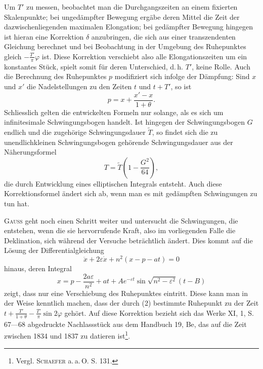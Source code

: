 Um \(T'\) zu messen, beobachtet man die Durchgangszeiten an einem fixierten
Skalenpunkte; bei ungedämpfter Bewegung ergäbe deren Mittel die Zeit der
dazwischenliegenden maximalen Elongation; bei gedämpfter Bewegung hingegen
ist hieran eine Korrektion \(\delta\) anzubringen, die sich aus einer transzendenten
Gleichung berechnet und bei Beobachtung in der Umgebung des Ruhepunktes
gleich \(-\frac{T'}{\pi}\varphi\) ist. Diese Korrektion verschiebt also alle Elongationszeiten
um ein konstantes Stück, spielt somit für deren Unterschied, d.\,h. \(T'\), keine
Rolle. Auch die Berechnung des Ruhepunktes \(p\) modifiziert sich infolge der
Dämpfung: Sind \(x\) und \(x'\) die Nadelstellungen zu den Zeiten \(t\) und \(t+T'\), so ist
\[
p=x+\frac{x'-x}{1+\theta}.\tag{2}
\]
\noindent Schliesslich gelten die entwickelten Formeln nur solange, als es sich um infinitesimale
Schwingungsbogen handelt. Ist hingegen der Schwingungsbogen
\(G\) endlich und die zugehörige Schwingungsdauer \(\widetilde T\), so findet sich die zu unendlichkleinen
Schwingungsbogen gehörende Schwingungsdauer aus der Näherungsformel
\[
T=\widetilde T\left(1-\frac{G^2}{64}\right),
\]
\noindent die durch Entwicklung eines elliptischen Integrals entsteht. Auch diese Korrektionsformel
ändert sich ab, wenn man es mit gedämpften Schwingungen zu
tun hat.

\textsc{Gauss} geht noch einen Schritt weiter und untersucht die Schwingungen,
die entstehen, wenn die sie hervorrufende Kraft, also im vorliegenden Falle
die Deklination, sich während der Versuche beträchtlich ändert. Dies kommt
auf die Lösung der Differentialgleichung
\[
\ddot{x}+2\varepsilon\dot{x}+n^2(x-p-at)=0\tag{3}
\]
\noindent hinaus, deren Integral
\[
x=p-\frac{2a\varepsilon}{n^2}+at+Ae^{-\varepsilon t}\sin\sqrt{n^2-\varepsilon^2}(t-B)
\]
\noindent zeigt, dass nur eine Verschiebung des Ruhepunktes eintritt. Diese kann man
in der Weise kenntlich machen, dass der durch (2) bestimmte Ruhepunkt zu
der Zeit \(t+\frac{T'}{1+\theta}-\frac{T'}{\pi}\sin2\varphi\) gehört. Auf diese Korrektion bezieht sich das
\clearpage{}
\noindent Werke XI, 1, S. 67—68 abgedruckte Nachlassstück aus dem Handbuch 19,
Be, das auf die Zeit zwischen 1834 und 1837 zu datieren ist\footnote{Vergl. \textsc{Schaefer} a.\,a.\,O. S. 131.}.

